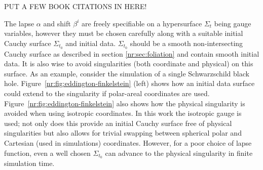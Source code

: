 \color{gren} PUT A FEW BOOK CITATIONS IN HERE! \color{black}

The lapse $\alpha$ and shift $\beta^i$ are freely specifiable on a hypersurface $\Sigma_t$ being gauge variables, however they must be chosen carefully along with a suitable initial Cauchy surface $\Sigma_{t_0}$ and initial data. $\Sigma_{t_0}$ should be a smooth non-intersecting Cauchy surface as described in section \ref{nr:sec:foliation} and contain smooth initial data. It is also wise to avoid singularities (both coordinate and physical) on this surface. As an example, consider the simulation of a single Schwarzschild black hole. Figure~\ref{nr:fig:eddington-finkelstein} (left) shows how an initial data surface could extend to the singularity if polar-areal coordinates are used. Figure~\ref{nr:fig:eddington-finkelstein} also shows how the physical singularity is avoided when using isotropic coordinates. In this work the isotropic gauge is used; not only does this provide an initial Cauchy surface free of physical singularities but also allows for trivial swapping between spherical polar and Cartesian (used in simulations) coordinates. However, for a poor choice of lapse function, even a well chosen $\Sigma_{t_0}$ can advance to the physical singularity in finite simulation time.


